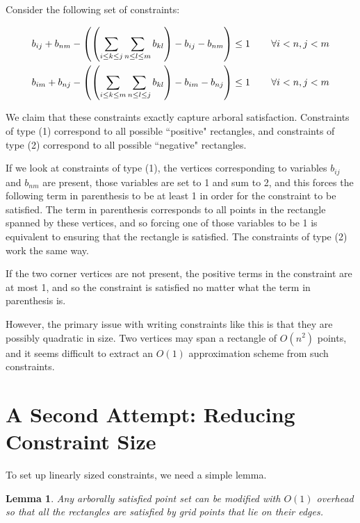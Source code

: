 \documentclass[11pt]{article}
\newtheorem{lemma}[theorem]{Lemma}
\begin{document}
Consider the following set of constraints:

\begin{align}
b_{ij} + b_{nm} - \left(\left(\sum_{i \leq k \leq j}\sum_{n\leq l \leq m} b_{kl}\right) - b_{ij} - b_{nm}\right) &\leq 1  \hspace{.3in} \forall i<n, j<m \\
b_{im} + b_{nj} - \left(\left(\sum_{i \leq k \leq m}\sum_{n\leq l \leq j} b_{kl}\right) - b_{im} - b_{nj}\right)  &\leq 1  \hspace{.3in} \forall i<n, j<m
\end{align}

We claim that these constraints exactly capture arboral satisfaction. Constraints of type (1) correspond to all possible ``positive" rectangles, and constraints of type (2) correspond to all possible ``negative" rectangles. 

If we look at constraints of type (1), the vertices corresponding to variables $b_{ij}$ and $b_{nm}$ are present, those variables are set to 1 and sum to 2, and this forces the following term in parenthesis to be at least 1 in order for the constraint to be satisfied. The term in parenthesis corresponds to all points in the rectangle spanned by these vertices, and so forcing one of those variables to be 1 is equivalent to ensuring that the rectangle is satisfied. The constraints of type (2) work the same way.

If the two corner vertices are not present, the positive terms in the constraint are at most 1, and so the constraint is satisfied no matter what the term in parenthesis is.

However, the primary issue with writing constraints like this is that they are possibly quadratic in size. Two vertices may span a rectangle of $O(n^2)$ points, and it seems difficult to extract an $O(1)$ approximation scheme from such constraints.

\section{A Second Attempt: Reducing Constraint Size}

To set up linearly sized constraints, we need a simple lemma.

\begin{lemma}
Any arborally satisfied point set can be modified with $O(1)$ overhead so that all the rectangles are satisfied by grid points that lie on their edges.
\end{lemma}
\end{document}
